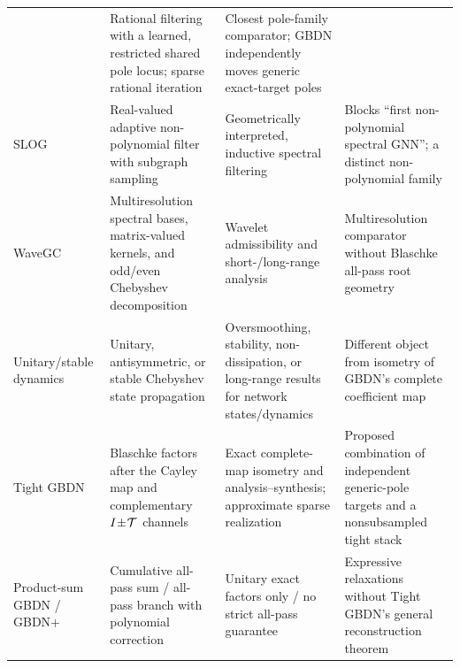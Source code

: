 \begin{table}[!ht]
\begin{tabularx}{\textwidth}{@{}>{\raggedright\arraybackslash}p{}>{\raggedright\arraybackslash}p{}>{\raggedright\arraybackslash}p{}X@{}}
& Rational filtering with a learned, restricted shared pole locus; sparse rational iteration
& Closest pole-family comparator; GBDN independently moves generic exact-target poles \\
SLOG~\cite{xu2024slog}
& Real-valued adaptive non-polynomial filter with subgraph sampling
& Geometrically interpreted, inductive spectral filtering
& Blocks ``first non-polynomial spectral GNN''; a distinct non-polynomial family \\
WaveGC~\cite{liu2025wavegc}
& Multiresolution spectral bases, matrix-valued kernels, and odd/even Chebyshev decomposition
& Wavelet admissibility and short-/long-range analysis
& Multiresolution comparator without Blaschke all-pass root geometry \\
Unitary/stable dynamics~\cite{kiani2024unitary,gravina2023adgn,hariri2025stablechebnet}
& Unitary, antisymmetric, or stable Chebyshev state propagation
& Oversmoothing, stability, non-dissipation, or long-range results for network states/dynamics
& Different object from isometry of GBDN's complete coefficient map \\
Tight GBDN
& Blaschke factors after the Cayley map and complementary $I\!\pm\!\mathcal T$ channels
& Exact complete-map isometry and analysis--synthesis; approximate sparse realization
& Proposed combination of independent generic-pole targets and a nonsubsampled tight stack \\
Product-sum GBDN / GBDN+
& Cumulative all-pass sum / all-pass branch with polynomial correction
& Unitary exact factors only / no strict all-pass guarantee
& Expressive relaxations without Tight GBDN's general reconstruction theorem \\
\bottomrule
\end{tabularx}
\end{table}
